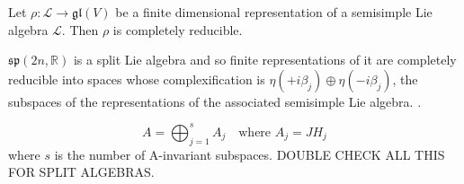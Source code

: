 \begin{lemma}
Let $\rho : \mathcal{L} \to \mathfrak{gl}(V)$ be a finite dimensional representation of a semisimple Lie algebra $\mathcal{L}$. Then $\rho$ is completely reducible. \cite{Humphreys pg28}
\end{lemma}


\begin{lemma}
$\mathfrak{sp}(2n,\mathbb{R})$ is a split Lie algebra and so finite representations of it are completely reducible into spaces whose complexification is $\eta(+i\beta_j) \oplus \eta(-i\beta_j)$, the subspaces of the representations of the associated semisimple Lie algebra. \cite{??}.
\end{lemma}

\begin{equation}
A = \bigoplus_{j=1}^s A_j \quad \text{where } A_j = JH_j
\end{equation}
where $s$ is the number of A-invariant subspaces. DOUBLE CHECK ALL THIS FOR SPLIT ALGEBRAS.
















